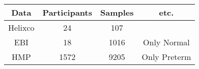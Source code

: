 \begin{tabular}{c|ccc}
    Data & Participants & Samples & etc. \\ \hline
    Helixco & 24 & 107 &  \\
    EBI & 18 & 1016 & Only Normal \\
    HMP & 1572 & 9205 & Only Preterm \\
\end{tabular}